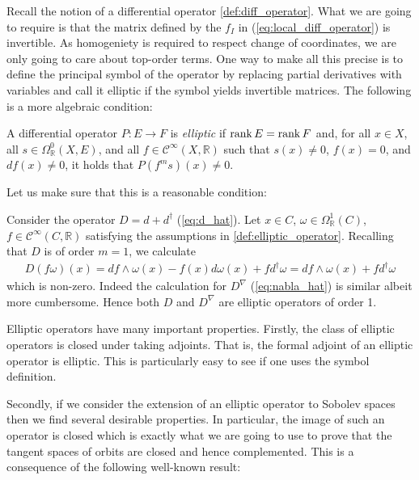 \documentclass[12pt]{ociamthesis}  %
\begin{document}
Recall the notion of a differential operator \ref{def:diff_operator}.
What we are going to require is that the matrix defined by the
$f_I$ in (\ref{eq:local_diff_operator}) is invertible.
As homogeniety is required to respect change of coordinates,
we are only going to care about top-order terms. One way to make all
this precise is to define the principal symbol of the operator by
replacing partial derivatives with variables and
call it elliptic if the symbol yields invertible matrices.
The following is a more algebraic condition:

\begin{definition}\label{def:elliptic_operator}
  A differential operator $P:E\to F$ is \emph{elliptic} if
  $\operatorname{rank} E = \operatorname{rank} F$ and, for all $x\in X$, all $s\in\Omega^0_{\mathbb R}(X,E)$,
  and all $f\in \mathscr C^\infty(X,\mathbb R)$ such that $s(x) \neq 0$,
  $f(x) = 0$, and $df(x) \neq 0$, it holds that $P(f^m s)(x) \neq 0$.
\end{definition}

Let us make sure that this is a reasonable condition:

\begin{example}
  Consider the operator $D = d + d^\dagger$ (\ref{eq:d_hat}). Let
  $x\in C$, $\omega\in\Omega^1_{\mathbb R}(C)$,
  $f\in \mathscr C^\infty(C,\mathbb R)$
  satisfying the assumptions in \ref{def:elliptic_operator}.
  Recalling that $D$ is of order $m=1$, we calculate
  \begin{align*}
    D(f\omega)(x)= df\wedge \omega(x) - f(x)d\omega(x) + fd^\dagger\omega= df\wedge\omega(x) + fd^\dagger\omega
  \end{align*}
  which is non-zero. Indeed the calculation for
  $D^\nabla$ (\ref{eq:nabla_hat}) is similar albeit more cumbersome.
  Hence both $D$ and $D^\nabla$ are elliptic operators of order 1.
\end{example}

Elliptic operators have many important properties. Firstly, the class
of elliptic operators is closed under taking adjoints. That is,
the formal adjoint of an elliptic operator is elliptic. This is particularly
easy to see if one uses the symbol definition.

Secondly, if we consider the extension of an elliptic operator
to Sobolev spaces then we find several desirable properties.
In particular, the image of such an operator is closed which is
exactly what we are going to use to prove that the tangent spaces
of orbits are closed and hence complemented. This is a consequence
of the following well-known result:
\end{document}
